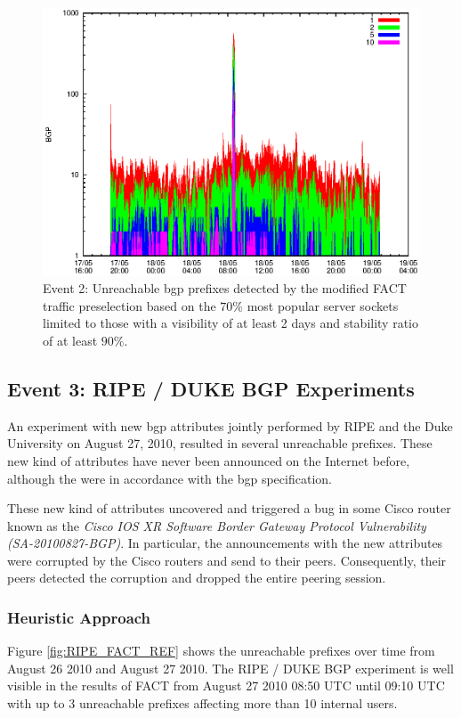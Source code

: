 \begin{figure}
	[p] \centering 
	\includegraphics[width=0.75\linewidth]{images/events/2010_05_18/bgp_log_Set_var_0_1_stab_9_vts_2.eps} \caption{Event 2: Unreachable \gls{bgp} prefixes detected by the modified \gls{FACT} traffic preselection based on the $70\%$ most popular \glspl{server socket} limited to those with a visibility of at least 2 days and stability ratio of at least $90\%$.} 
	\label{fig:TIER1_FACT_popularVTS2STAB9} 
\end{figure}

\newpage 
\subsection{Event 3: RIPE / DUKE BGP Experiments}

An experiment with new \gls{bgp} attributes jointly performed by RIPE and the Duke University on August 27, 2010, resulted in several unreachable prefixes\citep{SchatzmannPAM2011}.
These new kind of attributes have never been announced on the Internet before, although the were in accordance with the \gls{bgp} specification\citep{ripe_duke}.

These new kind of attributes uncovered and triggered a bug in some Cisco router known as the \emph{Cisco IOS XR Software Border Gateway Protocol Vulnerability (SA-20100827-BGP)}\citep{cisco_vulnerability}.
In particular, the announcements with the new attributes were corrupted by the Cisco routers and send to their peers.
Consequently, their peers detected the corruption and dropped the entire peering session\citep{ripe_duke}.

\subsubsection{Heuristic Approach} 
Figure \ref{fig:RIPE_FACT_REF} shows the unreachable prefixes over time from  August 26 2010 and August 27 2010.
The RIPE / DUKE BGP experiment is well visible in the results of \gls{FACT} from August 27 2010 08:50 UTC until 09:10 UTC with up to 3 unreachable prefixes affecting more than 10 internal users. 

